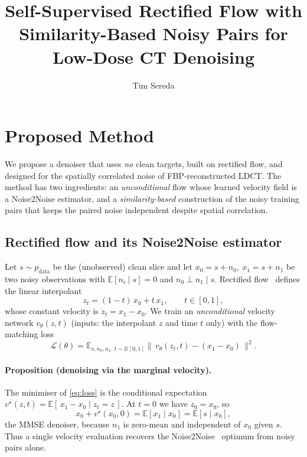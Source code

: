 \documentclass[10pt,twocolumn]{article}
\title{\textbf{Self-Supervised Rectified Flow with Similarity-Based
       Noisy Pairs for Low-Dose CT Denoising}}
\author{Tim Sereda}
\begin{document}
\maketitle

\section{Proposed Method}
\label{sec:method}

We propose a denoiser that uses \emph{no} clean targets, built on rectified
flow, and designed for the spatially correlated noise of FBP-reconstructed
LDCT. The method has two ingredients: an \emph{unconditional} flow whose
learned velocity field is a Noise2Noise estimator, and a
\emph{similarity-based} construction of the noisy training pairs that keeps
the paired noise independent despite spatial correlation.

\subsection{Rectified flow and its Noise2Noise estimator}
Let $s\sim p_{\text{data}}$ be the (unobserved) clean slice and let
$x_0=s+n_0,\ x_1=s+n_1$ be two noisy observations with
$\mathbb{E}[n_i\mid s]=0$ and $n_0\perp n_1\mid s$. Rectified
flow~\cite{lipman2022flow,liu2022flow} defines the linear interpolant
\begin{equation}
  z_t = (1-t)\,x_0 + t\,x_1,\qquad t\in[0,1],
\end{equation}
whose constant velocity is $\dot z_t = x_1-x_0$. We train an
\emph{unconditional} velocity network $v_\theta(z,t)$ (inputs: the
interpolant $z$ and time $t$ only) with the flow-matching loss
\begin{equation}
  \mathcal{L}(\theta)=
  \mathbb{E}_{s,n_0,n_1,\,t\sim\mathcal{U}[0,1]}
  \big\|\,v_\theta(z_t,t)-(x_1-x_0)\,\big\|^2 .
  \label{eq:loss}
\end{equation}

\paragraph{Proposition (denoising via the marginal velocity).}
The minimiser of \eqref{eq:loss} is the conditional expectation
$v^\star(z,t)=\mathbb{E}[\,x_1-x_0\mid z_t=z\,]$. At $t=0$ we have
$z_0=x_0$, so
\begin{equation}
  x_0 + v^\star(x_0,0)
  = \mathbb{E}[x_1\mid x_0]
  = \mathbb{E}[s\mid x_0],
  \label{eq:mmse}
\end{equation}
the MMSE denoiser, because $n_1$ is zero-mean and independent of $x_0$
given $s$. Thus a single velocity evaluation recovers the
Noise2Noise~\cite{lehtinen2018noise2noise} optimum from noisy pairs alone.
\end{document}
